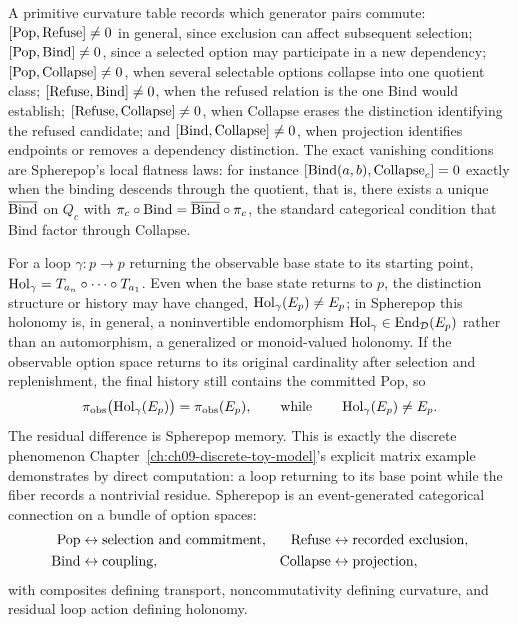 A primitive curvature table records which generator pairs commute: $[\mathrm{Pop},\mathrm{Refuse}] \neq 0$ in general, since exclusion can affect subsequent selection; $[\mathrm{Pop},\mathrm{Bind}] \neq 0$, since a selected option may participate in a new dependency; $[\mathrm{Pop},\mathrm{Collapse}] \neq 0$, when several selectable options collapse into one quotient class; $[\mathrm{Refuse},\mathrm{Bind}] \neq 0$, when the refused relation is the one Bind would establish; $[\mathrm{Refuse},\mathrm{Collapse}] \neq 0$, when Collapse erases the distinction identifying the refused candidate; and $[\mathrm{Bind},\mathrm{Collapse}] \neq 0$, when projection identifies endpoints or removes a dependency distinction. The exact vanishing conditions are Spherepop's local flatness laws: for instance $[\mathrm{Bind}(a,b), \mathrm{Collapse}_c] = 0$ exactly when the binding descends through the quotient, that is, there exists a unique $\overline{\mathrm{Bind}}$ on $Q_c$ with $\pi_c \circ \mathrm{Bind} = \overline{\mathrm{Bind}} \circ \pi_c$, the standard categorical condition that Bind factor through Collapse.

For a loop $\gamma : p \to p$ returning the observable base state to its starting point, $\operatorname{Hol}_\gamma = T_{a_n} \circ \cdots \circ T_{a_1}$. Even when the base state returns to $p$, the distinction structure or history may have changed, $\operatorname{Hol}_\gamma(E_p) \neq E_p$; in Spherepop this holonomy is, in general, a noninvertible endomorphism $\operatorname{Hol}_\gamma \in \operatorname{End}_{\mathcal{D}}(E_p)$ rather than an automorphism, a generalized or monoid-valued holonomy. If the observable option space returns to its original cardinality after selection and replenishment, the final history still contains the committed Pop, so
\[
\pi_{\mathrm{obs}}\bigl(\operatorname{Hol}_\gamma(E_p)\bigr) = \pi_{\mathrm{obs}}(E_p), \qquad \text{while} \qquad \operatorname{Hol}_\gamma(E_p) \neq E_p.
\]
The residual difference is Spherepop memory. This is exactly the discrete phenomenon Chapter~\ref{ch:ch09-discrete-toy-model}'s explicit matrix example demonstrates by direct computation: a loop returning to its base point while the fiber records a nontrivial residue. Spherepop is an event-generated categorical connection on a bundle of option spaces:
\[
\begin{aligned}
\mathrm{Pop} &\leftrightarrow \text{selection and commitment}, & \mathrm{Refuse} &\leftrightarrow \text{recorded exclusion}, \\
\mathrm{Bind} &\leftrightarrow \text{coupling}, & \mathrm{Collapse} &\leftrightarrow \text{projection},
\end{aligned}
\]
with composites defining transport, noncommutativity defining curvature, and residual loop action defining holonomy.

